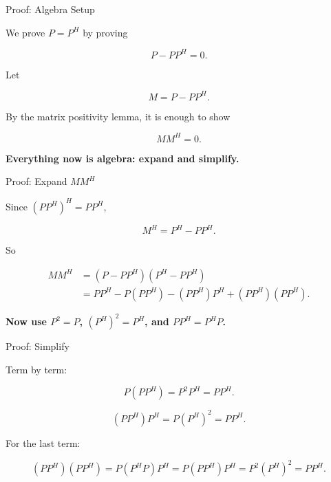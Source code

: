 \documentclass[10pt]{beamer}
\theoremstyle{definition}
\newcommand{\x}[1]{\alert{\textbf{#1}}}
\begin{document}
\begin{frame}{Proof: Algebra Setup}

We prove $P=P^H$ by proving

$$
P-PP^H=0.
$$

\vfill

Let

$$
M=P-PP^H.
$$

\vfill

By the matrix positivity lemma, it is enough to show

$$
MM^H=0.
$$

\vfill

\begin{center}
\x{Everything now is algebra: expand and simplify.}
\end{center}

\end{frame}


\begin{frame}{Proof: Expand $MM^H$}

Since $(PP^H)^H=PP^H$,

$$
M^H=P^H-PP^H.
$$

\vfill

So

$$
\begin{aligned}
MM^H
&=(P-PP^H)(P^H-PP^H)\\
&=PP^H-P(PP^H)-(PP^H)P^H+(PP^H)(PP^H).
\end{aligned}
$$

\vfill

\begin{center}
\x{Now use $P^2=P$, $(P^H)^2=P^H$, and $PP^H=P^HP$.}
\end{center}

\end{frame}


\begin{frame}{Proof: Simplify}

Term by term:

$$
P(PP^H)=P^2P^H=PP^H.
$$

\vfill

$$
(PP^H)P^H=P(P^H)^2=PP^H.
$$

\vfill

For the last term:

$$
(PP^H)(PP^H)
=P(P^HP)P^H
=P(PP^H)P^H
=P^2(P^H)^2
=PP^H.
$$

\end{frame}
\end{document}

